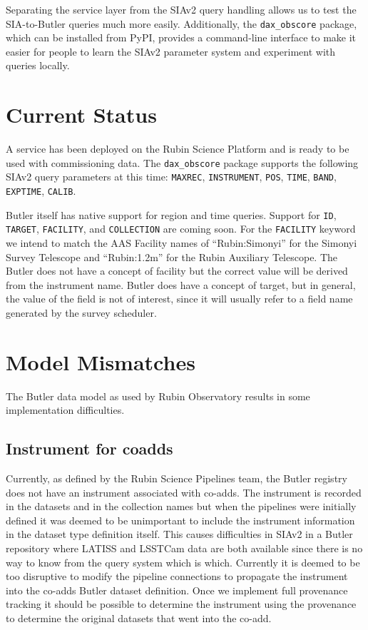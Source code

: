 \documentclass[11pt,twoside]{article}
\begin{document}
Separating the service layer from the SIAv2 query handling allows us to test the SIA-to-Butler queries much more easily.
Additionally, the \texttt{dax\_obscore} package, which can be installed from PyPI, provides a command-line interface to make it easier for people to learn the SIAv2 parameter system and experiment with queries locally.

\section{Current Status}

A service has been deployed on the Rubin Science Platform and is ready to be used with commissioning data.
The \texttt{dax\_obscore} package supports the following SIAv2 query parameters at this time:
\texttt{MAXREC},
\texttt{INSTRUMENT},
\texttt{POS},
\texttt{TIME},
\texttt{BAND},
\texttt{EXPTIME},
\texttt{CALIB}.

Butler itself has native support for region and time queries.
Support for
\texttt{ID},
\texttt{TARGET},
\texttt{FACILITY},
and \texttt{COLLECTION} are coming soon.
For the \texttt{FACILITY} keyword we intend to match the AAS Facility names of ``Rubin:Simonyi'' for the Simonyi Survey Telescope and ``Rubin:1.2m'' for the Rubin Auxiliary Telescope.
The Butler does not have a concept of facility but the correct value will be derived from the instrument name.
Butler does have a concept of target, but in general, the value of the field is not of interest, since it will usually refer to a field name generated by the survey scheduler.

\section{Model Mismatches}

The Butler data model as used by Rubin Observatory results in some implementation difficulties.

\subsection{Instrument for coadds}

Currently, as defined by the Rubin Science Pipelines team, the Butler registry does not have an instrument associated with co-adds.
The instrument is recorded in the datasets and in the collection names but when the pipelines were initially defined it was deemed to be unimportant to include the instrument information in the dataset type definition itself.
This causes difficulties in SIAv2 in a Butler repository where LATISS and LSSTCam data are both available since there is no way to know from the query system which is which.
Currently it is deemed to be too disruptive to modify the pipeline connections to propagate the instrument into the co-adds Butler dataset definition.
Once we implement full provenance tracking it should be possible to determine the instrument using the provenance to determine the original datasets that went into the co-add.
\end{document}
